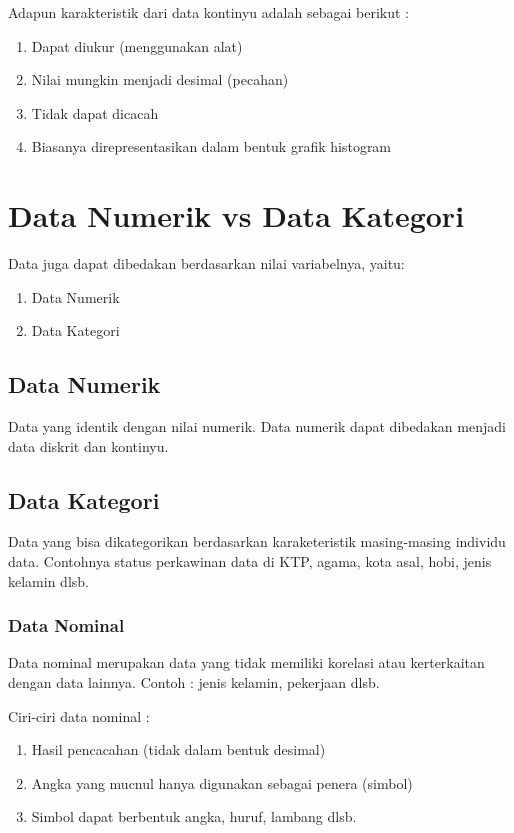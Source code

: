 Adapun karakteristik dari data kontinyu adalah sebagai berikut :
\begin{enumerate}
	\item Dapat diukur (menggunakan alat)
	\item Nilai mungkin menjadi desimal (pecahan)
	\item Tidak dapat dicacah
	\item Biasanya direpresentasikan dalam bentuk grafik histogram
\end{enumerate}

\section{Data Numerik vs Data Kategori}
Data juga dapat dibedakan berdasarkan nilai variabelnya, yaitu:
\begin{enumerate}
	\item Data Numerik
	\item Data Kategori
\end{enumerate}

\subsection{Data Numerik}
Data yang identik dengan nilai numerik. Data numerik dapat dibedakan menjadi data diskrit dan kontinyu.

\subsection{Data Kategori}
Data yang bisa dikategorikan berdasarkan karaketeristik masing-masing individu data. Contohnya status perkawinan data di KTP, agama, kota asal, hobi, jenis kelamin dlsb.
\subsubsection{Data Nominal}
Data nominal merupakan data yang tidak memiliki korelasi atau kerterkaitan dengan data lainnya. Contoh : jenis kelamin, pekerjaan dlsb.

Ciri-ciri data nominal :
\begin{enumerate}
	\item Hasil pencacahan (tidak dalam bentuk desimal)
	\item Angka yang mucnul hanya digunakan sebagai penera (simbol)
	\item Simbol dapat berbentuk angka, huruf, lambang dlsb.
\end{enumerate}


